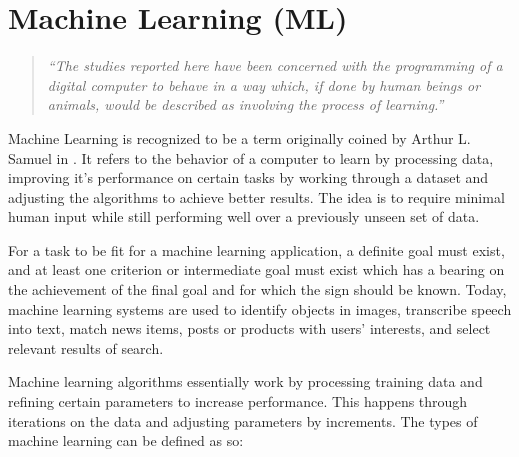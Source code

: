 \section{Machine Learning (ML)}
\begin{quotation}
	\emph{``The studies reported here have been concerned with the
			programming of a digital computer to behave in a way
			which, if done by human beings or animals, would be
			described as involving the process of learning.''}
	\citep{samuel_machinelearning}
\end{quotation} 

Machine Learning is recognized to be a term originally coined by Arthur L. Samuel in \cite{samuel_machinelearning}. It refers to the behavior of a computer to learn by processing data, improving it's performance on certain tasks by working through a dataset and adjusting the algorithms to achieve better results. The idea is to require minimal human input while still performing well over a previously unseen set of data.

For a task to be fit for a machine learning application, a definite goal must exist, and at least one criterion or intermediate goal must exist which has a bearing on the achievement of the final goal and for which the sign should be known. \citep{samuel_machinelearning} Today, machine learning systems are used to identify objects in images, transcribe speech into text, match news items, posts or products with users’ interests, and select relevant results of search. \citep{deeplearning}

Machine learning algorithms essentially work by processing training data and refining certain parameters to increase performance. This happens through iterations on the data and adjusting parameters by increments. The types of machine learning can be defined as so:


